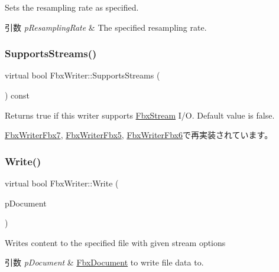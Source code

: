 Sets the resampling rate as specified. 
\begin{DoxyParams}{引数}
{\em p\+Resampling\+Rate} & The specified resampling rate. \\
\hline
\end{DoxyParams}
\mbox{\label{class_fbx_writer_aa79a285227d113ee6d64aee6a84986cd}} 
\subsubsection{\texorpdfstring{Supports\+Streams()}{SupportsStreams()}}
{\footnotesize\ttfamily virtual bool Fbx\+Writer\+::\+Supports\+Streams (\begin{DoxyParamCaption}{ }\end{DoxyParamCaption}) const\hspace{0.3cm}{\ttfamily [virtual]}}

Returns true if this writer supports \hyperlink{class_fbx_stream}{Fbx\+Stream} I/O. Default value is false. 

\hyperlink{class_fbx_writer_fbx7_a1db3d07967773f3b1af23d15757c281a}{Fbx\+Writer\+Fbx7}, \hyperlink{class_fbx_writer_fbx5_a6e6683ad630d545bd0251f7bf8e114d9}{Fbx\+Writer\+Fbx5}, \hyperlink{class_fbx_writer_fbx6_a74bc2a2a859a59118567ac2d0a471ef7}{Fbx\+Writer\+Fbx6}で再実装されています。

\mbox{\label{class_fbx_writer_aa8c0277611da0fdb0b9a184c55c30c2c}} 
\subsubsection{\texorpdfstring{Write()}{Write()}}
{\footnotesize\ttfamily virtual bool Fbx\+Writer\+::\+Write (\begin{DoxyParamCaption}\item[{\hyperlink{class_fbx_document}{Fbx\+Document} $\ast$}]{p\+Document }\end{DoxyParamCaption})\hspace{0.3cm}{\ttfamily [pure virtual]}}

Writes content to the specified file with given stream options 
\begin{DoxyParams}{引数}
{\em p\+Document} & \hyperlink{class_fbx_document}{Fbx\+Document} to write file data to. \\
\hline
\end{DoxyParams}


